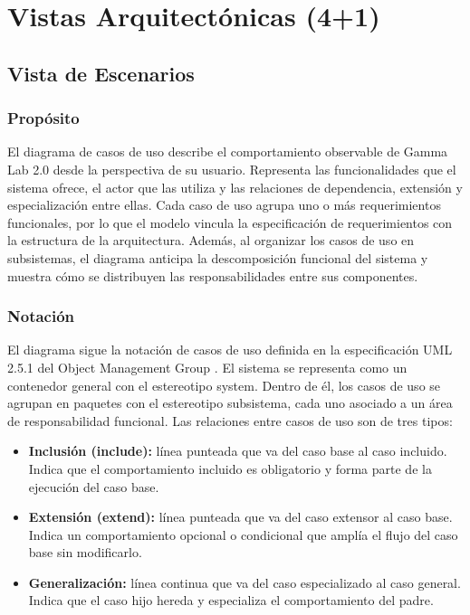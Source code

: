 \documentclass[11pt,a4paper]{article}
\DeclareRobustCommand{\_}{\textunderscore\allowbreak}
\begin{document}
\section{Vistas Arquitect\'onicas (4+1)}



\subsection{Vista de Escenarios}
\label{sec:vista_escenarios}

\subsubsection{Prop\'osito}

El diagrama de casos de uso describe el comportamiento observable de Gamma Lab 2.0 desde la perspectiva de su usuario. Representa las funcionalidades que el sistema ofrece, el actor que las utiliza y las relaciones de dependencia, extensi\'on y especializaci\'on entre ellas. Cada caso de uso agrupa uno o m\'as requerimientos funcionales, por lo que el modelo vincula la especificaci\'on de requerimientos con la estructura de la arquitectura. Adem\'as, al organizar los casos de uso en subsistemas, el diagrama anticipa la descomposici\'on funcional del sistema y muestra c\'omo se distribuyen las responsabilidades entre sus componentes.

\subsubsection{Notaci\'on}

El diagrama sigue la notaci\'on de casos de uso definida en la especificaci\'on UML 2.5.1 del Object Management Group \cite{omg_uml}. El sistema se representa como un contenedor general con el estereotipo \guillemotleft system\guillemotright. Dentro de \'el, los casos de uso se agrupan en paquetes con el estereotipo \guillemotleft subsistema\guillemotright, cada uno asociado a un \'area de responsabilidad funcional. Las relaciones entre casos de uso son de tres tipos:

\begin{itemize}
    \item \textbf{Inclusi\'on (\guillemotleft include\guillemotright):} l\'inea punteada que va del caso base al caso incluido. Indica que el comportamiento incluido es obligatorio y forma parte de la ejecuci\'on del caso base.
    \item \textbf{Extensi\'on (\guillemotleft extend\guillemotright):} l\'inea punteada que va del caso extensor al caso base. Indica un comportamiento opcional o condicional que ampl\'ia el flujo del caso base sin modificarlo.
    \item \textbf{Generalizaci\'on:} l\'inea continua que va del caso especializado al caso general. Indica que el caso hijo hereda y especializa el comportamiento del padre.
\end{itemize}
\end{document}
